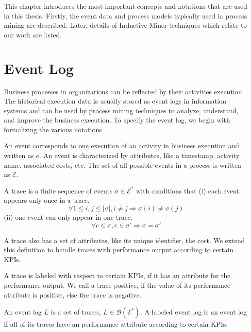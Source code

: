 This chapter introduces the most important concepts and notations that are used in this thesis. Firstly, the event data and process models typically used in process mining are described. Later, details of Inductive Miner techniques which relate to our work are listed.
\section{Event Log}
Business processes in organizations can be reflected by their activities execution. The historical execution data is usually stored as event logs in information systems and can be used by process mining techniques to analyze, understand, and improve the business execution. To specify the event log, we begin with formalizing the various notations\cite{van2016data} .
\begin{definition}[Event]
	An event corresponds to one execution of an activity in business execution and written as $e$. An event is characterized by attributes, like a timestamp, activity name, associated costs, etc. The set of all possible events in a process is written as $\mathcal{E}$.
\end{definition}
\begin{definition}[Trace]
A trace is a finite sequence of events $\sigma \in \mathcal{E}^*$ with conditions that (i)  each event  appears only once in a trace. 
\[ \forall  1 \leq i,j \leq \vert \sigma \vert,  i \neq j \Rightarrow \sigma (i) \neq \sigma (j) \] 
(ii) one event can only appear in one trace. 
\[ \forall e \in \sigma, e \in \sigma\prime \Rightarrow \sigma = \sigma\prime \]  
\end{definition}
A trace also has a set of attributes, like its unique identifier, the cost. We extend this definition to handle traces with performance output according to certain KPIs. 
\begin{definition}
A trace is labeled with respect to certain KPIs, if it has an attribute for the performance output. We call a trace positive, if the value of its performance attribute is positive, else the trace is negative.
\end{definition}
\begin{definition}
An event log $L$ is a set of traces, $L \in \mathcal{B(\mathcal{E}^*)}$. A labeled event log is an event log if all of its traces have an performance attribute according to certain KPIs.
\end{definition}
